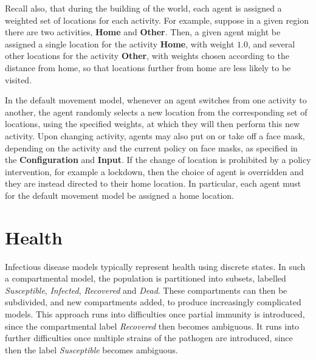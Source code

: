 \documentclass[10pt,letterpaper]{article}
\begin{document}
Recall also, that during the building of the world, each agent is assigned a weighted set of locations for each activity. For example, suppose in a given region there are two activities, \textbf{Home} and \textbf{Other}. Then, a given agent might be assigned a single location for the activity \textbf{Home}, with weight $1.0$, and several other locations for the activity \textbf{Other}, with weights chosen according to the distance from home, so that locations further from home are less likely to be visited.

In the default movement model, whenever an agent switches from one activity to another, the agent randomly selects a new location from the corresponding set of locations, using the specified weights, at which they will then perform this new activity. Upon changing activity, agents may also put on or take off a face mask, depending on the activity and the current policy on face masks, as specified in the \textbf{Configuration} and \textbf{Input}. If the change of location is prohibited by a policy intervention, for example a lockdown, then the choice of agent is overridden and they are instead directed to their home location. In particular, each agent must for the default movement model be assigned a home location.

\section{Health}\label{sec:health}

Infectious disease models typically represent health using discrete states. In such a compartmental model, the population is partitioned into subsets, labelled \textit{Susceptible}, \textit{Infected}, \textit{Recovered} and \textit{Dead}. These compartments can then be subdivided, and new compartments added, to produce increasingly complicated models. This approach runs into difficulties once partial immunity is introduced, since the compartmental label \textit{Recovered} then becomes ambiguous. It runs into further difficulties once multiple strains of the pathogen are introduced, since then the label \textit{Susceptible} becomes ambiguous.
\end{document}
